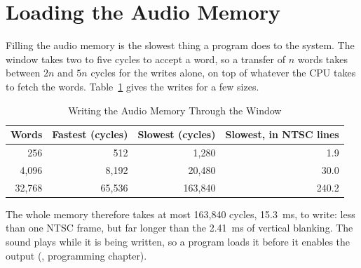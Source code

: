 \section{Loading the Audio Memory}

Filling the audio memory is the slowest thing a program does to the system. The window takes two to five cycles to
accept a word, so a transfer of $n$ words takes between $2n$ and $5n$ cycles for the writes alone, on top of whatever
the CPU takes to fetch the words. Table~\ref{tab:load-times} gives the writes for a few sizes.

\begin{table}[H]
	\centering
	\begin{tabular}{rrrr}
		\toprule
		\textbf{Words} & \textbf{Fastest (cycles)} & \textbf{Slowest (cycles)} & \textbf{Slowest, in NTSC lines} \\
		\midrule
		256            & 512                       & 1,280                     & 1.9                             \\
		4,096          & 8,192                     & 20,480                    & 30.0                            \\
		32,768         & 65,536                    & 163,840                   & 240.2                           \\
		\bottomrule
	\end{tabular}
	\caption{Writing the Audio Memory Through the Window}
	\label{tab:load-times}
\end{table}

\noindent The whole memory therefore takes at most 163,840 cycles, 15.3~ms, to write: less than one NTSC frame, but far longer than the 2.41~ms of vertical blanking. The sound plays while it is being written, so a program loads it before it enables
the output (\audiomanual{}, programming chapter).

